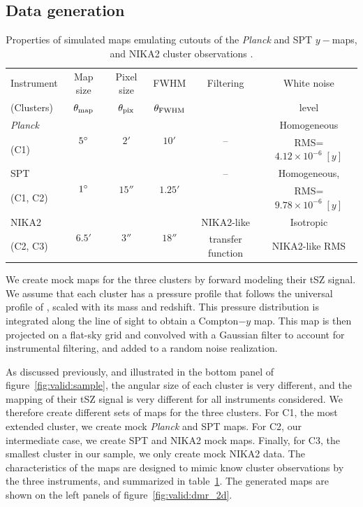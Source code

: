 \subsection{Data generation} \label{sec:simu:mkdata}

\begin{table}[htp]
    \centering
    \begin{tabular}{l c c c c c}
        \toprule
        Instrument & Map size & Pixel size & FWHM & Filtering & White noise \\
        (Clusters) & $\theta_{\rm map}$ & $\theta_{\rm pix}$ & $\theta_{\rm FWHM}$ & & level \\
        \midrule
        \textit{Planck} & \multirow{2}{*}{$5\degree$} & \multirow{2}{*}{$2'$} & \multirow{2}{*}{$10'$} & \multirow{2}{*}{--} & Homogeneous \\
        (C1) & & & & & RMS=$4.12 \times 10^{-6} \; [y]$ \\
        \midrule
        SPT & \multirow{2}{*}{$1\degree$} & \multirow{2}{*}{$15''$} & \multirow{2}{*}{$1.25'$} & -- & Homogeneous, \\
        (C1, C2) & & & & & RMS=$9.78 \times 10^{-6} \; [y]$ \\
        \midrule
        NIKA2 & \multirow{2}{*}{$6.5'$} & \multirow{2}{*}{$3''$} & \multirow{2}{*}{$18''$} & NIKA2-like & Isotropic \\
        (C2, C3) & & & & transfer function & NIKA2-like RMS \\
        \bottomrule
    \end{tabular}
    \caption{\normalfont
        Properties of simulated maps emulating cutouts of the \textit{Planck} \citep{planck_collaboration_planck_2016} and SPT \citep{bleem_cmbksz_2022} $y-$maps, and NIKA2 cluster observations \citep{keruzore_exploiting_2020}.
    }
    \label{tab:simu:map_props}
\end{table}


We create mock maps for the three clusters by forward modeling their tSZ signal.
We assume that each cluster has a pressure profile that follows the universal profile of \aten, scaled with its mass and redshift.
This pressure distribution is integrated along the line of sight to obtain a Compton$-y$ map.
This map is then projected on a flat-sky grid and convolved with a Gaussian filter to account for instrumental filtering, and added to a random noise realization.

As discussed previously, and illustrated in the bottom panel of figure~\ref{fig:valid:sample}, the angular size of each cluster is very different, and the mapping of their tSZ signal is very different for all instruments considered.
We therefore create different sets of maps for the three clusters.
For C1, the most extended cluster, we create mock \textit{Planck} and SPT maps.
For C2, our intermediate case, we create SPT and NIKA2 mock maps.
Finally, for C3, the smallest cluster in our sample, we only create mock NIKA2 data.
The characteristics of the maps are designed to mimic know cluster observations by the three instruments, and summarized in table~\ref{tab:simu:map_props}.
The generated maps are shown on the left panels of figure~\ref{fig:valid:dmr_2d}.


